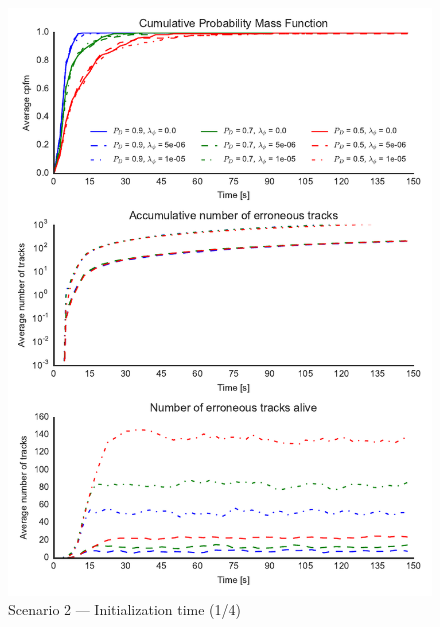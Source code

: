 \begin{figure}
\centering
\includegraphics{Figures/plots/Scenario2_Init-Time(1-4).pdf}
\caption{Scenario 2 --- Initialization time (1/4)}\label{fig:init2_time_1-4}
\end{figure}

